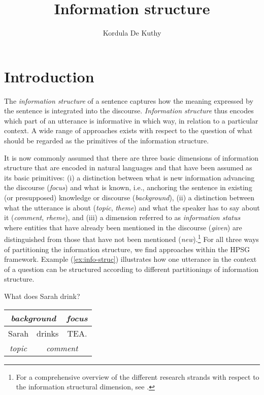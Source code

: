 \documentclass[output=paper,biblatex,babelshorthands,newtxmath,draftmode,colorlinks,citecolor=brown]{langscibook}
\author{Kordula {De Kuthy}\orcid{0000-0003-2318-3754}\affiliation{Universität Tübingen}}
\title{Information structure}
\begin{document}
\maketitle
\label{chap-information-structure}



\section{Introduction} 

\largerpage
The \textit{information structure} of a sentence captures how the meaning
expressed by the sentence is integrated into the discourse.
\textit{Information structure} thus encodes which part of an
  utterance is informative in which way, in relation to a particular context.
A wide range of approaches exists with respect to the question of what
should be regarded as the primitives of the information structure.

It is now commonly assumed that there are three basic dimensions of
information structure that are encoded in natural languages and that
have been assumed as its basic primitives: (i) a distinction between
what is new information advancing the discourse (\emph{focus}) and
what is known, i.e., anchoring the sentence in existing (or
presupposed) knowledge or discourse (\emph{background}), (ii) a
distinction between what the utterance is about (\emph{topic},
\emph{theme}) and what the speaker has to say about it
(\emph{comment}, \emph{rheme}), and (iii) a dimension referred to as
\textit{information status} where entities that have already been
mentioned in the discourse (\textit{given}) are distinguished from
those that have not been mentioned (\emph{new}).\footnote{For a comprehensive overview of the different research strands with respect to the information structural dimension, see \citet{KruijffSteedman2003}.} For all three ways of
partitioning the information structure, we find approaches within the
HPSG framework.  Example (\ref{ex:info-struc}) illustrates how one
utterance in the context of a question can be structured according to
different partitionings of information structure.
\begin{exe}
\ex\label{ex:info-struc}
\begin{xlist}
  What does Sarah drink?
  \begin{tabular}[c]{|c|c|c|}
\multicolumn{2}{c|}{\small\textsl{background}} & \multicolumn{1}{c}{\small\textsl{focus}}\\\hline 
Sarah & drinks & TEA.\\\hline
\multicolumn{1}{c|}{\small\textsl{topic}} & \multicolumn{2}{c}{\small\textsl{comment}}\\
  \end{tabular}
\end{xlist}

\end{exe}
\end{document}
